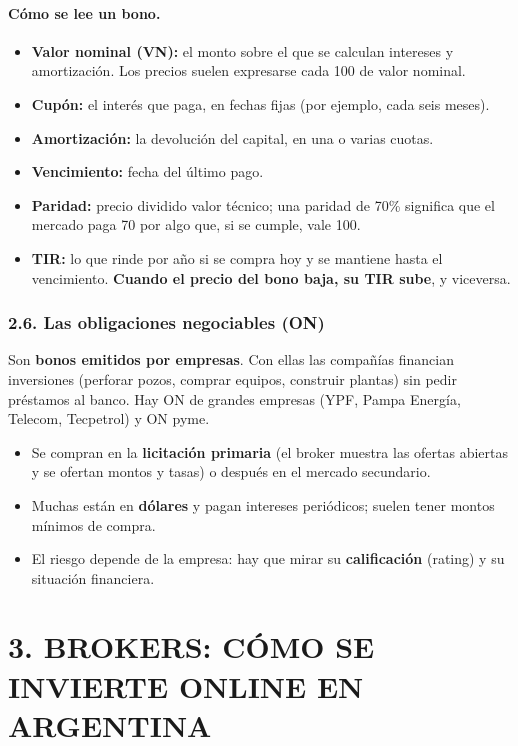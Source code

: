 \paragraph*{Cómo se lee un bono.}
\begin{itemize}
  \item \textbf{Valor nominal (VN):} el monto sobre el que se calculan intereses y amortización.
        Los precios suelen expresarse cada 100 de valor nominal.
  \item \textbf{Cupón:} el interés que paga, en fechas fijas (por ejemplo, cada seis meses).
  \item \textbf{Amortización:} la devolución del capital, en una o varias cuotas.
  \item \textbf{Vencimiento:} fecha del último pago.
  \item \textbf{Paridad:} precio dividido valor técnico; una paridad de 70\% significa que el
        mercado paga 70 por algo que, si se cumple, vale 100.
  \item \textbf{TIR:} lo que rinde por año si se compra hoy y se mantiene hasta el vencimiento.
        \textbf{Cuando el precio del bono baja, su TIR sube}, y viceversa.
\end{itemize}

\subsubsection*{2.6. Las obligaciones negociables (ON)}
Son \textbf{bonos emitidos por empresas}. Con ellas las compañías financian inversiones
(perforar pozos, comprar equipos, construir plantas) sin pedir préstamos al banco. Hay ON de
grandes empresas (YPF, Pampa Energía, Telecom, Tecpetrol) y ON pyme.
\begin{itemize}
  \item Se compran en la \textbf{licitación primaria} (el broker muestra las ofertas abiertas y
        se ofertan montos y tasas) o después en el mercado secundario.
  \item Muchas están en \textbf{dólares} y pagan intereses periódicos; suelen tener montos
        mínimos de compra.
  \item El riesgo depende de la empresa: hay que mirar su \textbf{calificación} (rating) y su
        situación financiera.
\end{itemize}

\section*{3. BROKERS: CÓMO SE INVIERTE ONLINE EN ARGENTINA}

